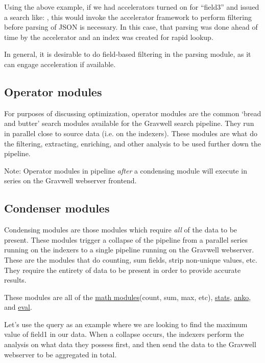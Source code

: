 Using the above example, if we had accelerators turned on for ``field3''
and issued a search like: , this would invoke the
accelerator framework to perform filtering before parsing of JSON is
necessary. In this case, that parsing was done ahead of time by the
accelerator and an index was created for rapid lookup.

In general, it is desirable to do field-based filtering in the parsing
module, as it can engage acceleration if available.

\subsection{Operator modules}

For purposes of discussing optimization, operator modules are the
common `bread and butter' search modules available for the Gravwell
search pipeline. They run in parallel close to source data (i.e. on
the indexers). These modules are what do the filtering, extracting,
enriching, and other analysis to be used further down the pipeline.

Note: Operator modules in pipeline \emph{after} a condensing module will
execute in series on the Gravwell webserver frontend.

\subsection{Condenser modules}

Condensing modules are those modules which require \emph{all} of the data to
be present. These modules trigger a collapse of the pipeline from a
parallel series running on the indexers to a single pipeline running on
the Gravwell webserver. These are the modules that do counting, sum
fields, strip non-unique values, etc. They require the entirety of data
to be present in order to provide accurate results.

These modules are all of the \href{https://docs.gravwell.io/\#!search/math/math.md}{math
modules}(count, sum, max, etc),
\href{https://docs.gravwell.io/\#!search/stats/stats.md}{stats},
\href{https://docs.gravwell.io/\#!search/anko/anko.md}{anko}, and
\href{https://docs.gravwell.io/\#!search/eval/eval.md}{eval}.

Let's use the query  as an
example where we are looking to find the maximum value of field1 in our
data. When a collapse occurs, the indexers perform the analysis on what
data they possess first, and then send the data to the Gravwell
webserver to be aggregated in total.

